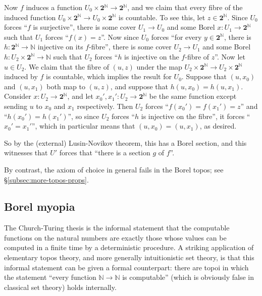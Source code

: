 \documentclass[11pt]{amsart}
\newcommand{\N}{\mathbb{N}}
\newcommand\two{\mathbf{2}}
\theoremstyle{definition}
\theoremstyle{remark}
\theoremstyle{plain}
\begin{document}
Now \( f \) induces a function \( U_0 \times \two^\N \to \two^\N \),
and we claim that every fibre of the induced function
\( U_0 \times \two^\N \to U_0 \times \two^\N \)
is countable.
To see this,
let \( z \in \two^\N \).
Since \( U_0 \) forces ``\( f \) is surjective'',
there is some cover \( U_1 \to U_0 \)
and some Borel \(x \colon U_1 \to \two^\N \)
such that \( U_1 \) forces ``\( f(x) = z \)''.
Now since \( U_0 \) forces
``for every \( y \in \two^\N \), there is \( h \colon \two^\N \to \N \)
injective on its \( f \)-fibre'',
there is some cover \( U_2 \to U_1 \)
and some Borel \( h \colon U_2 \times \two^\N \to \N \)
such that \( U_2 \) forces
``\( h \) is injective on the \( f \)-fibre of \( z \)''.
Now let \( u \in U_2 \).
We claim that the fibre of \( (u, z) \) under the map
\( U_2 \times \two^\N \to U_2 \times \two^\N \) induced by \( f \)
is countable,
which implies the result for \( U_0 \).
Suppose that \( (u, x_0) \) and \( (u, x_1) \) both map to \( (u, z) \),
and suppose that \( h(u, x_0) = h(u, x_1) \).
Consider \( x \colon U_2 \to \two^\N \),
and let \( x_0', x_1' \colon U_2 \to \two^\N \)
be the same function except sending
\( u \) to \( x_0 \) and \( x_1 \) respectively.
Then \( U_2 \) forces ``\( f(x_0') = f(x_1') = z \)''
and ``\( h(x_0') = h(x_1') \)'',
so since \( U_2 \) forces ``\( h \) is injective on the fibre'',
it forces ``\(x_0' = x_1'\)'',
which in particular means that \( (u, x_0) = (u, x_1) \),
as desired.

So by the (external) Lusin-Novikov theorem,
this has a Borel section,
and this witnesses that \( U' \) forces that
``there is a section \( g \) of \( f \)''.

By contrast, the axiom of choice in general fails in the Borel topos; see \S\ref{subsec:more-topos-props}.

\subsection{Borel myopia} \label{subsec:borel-myopia}
The Church-Turing thesis is the informal statement that the computable functions on the natural numbers are exactly those whose values can be computed in a finite time by a deterministic procedure.
A striking application of elementary topos theory, and more generally intuitionistic set theory, is that this informal statement can be given a formal counterpart: there are topoi in which the statement ``every function \( \N \to \N \) is computable'' (which is obviously false in classical set theory) holds internally. \cite{hyland-effective-topos,nashaat-powell-valued-models}
\end{document}
